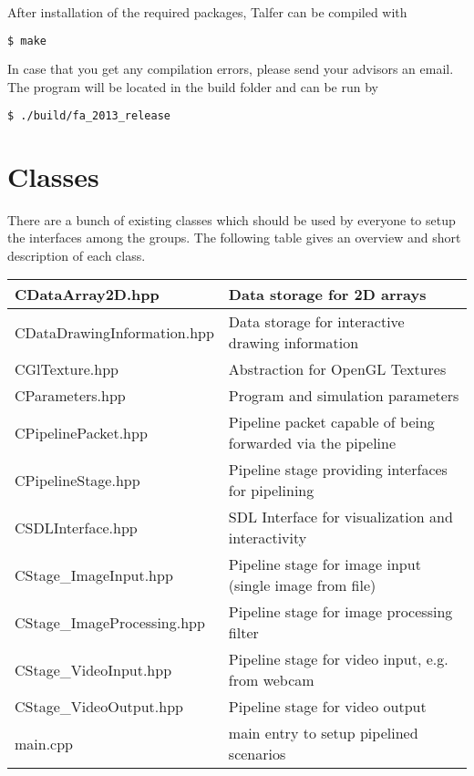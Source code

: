 \documentclass[11pt,a4paper]{article}
\begin{document}
After installation of the required packages, Talfer can be compiled with

\begin{lstlisting}[language=sh]
$ make
\end{lstlisting}

In case that you get any compilation errors, please send your advisors an
email. The program will be located in the build folder and can be run by

\begin{lstlisting}[language=sh]
$ ./build/fa_2013_release
\end{lstlisting}





\section{Classes}

There are a bunch of existing classes which should be used by everyone to setup
the interfaces among the groups.
The following table gives an overview and short description of each class.

\noindent
\begin{tabular}{|l|l|}
	\hline
	CDataArray2D.hpp				&
		Data storage for 2D arrays							\\
	\hline
	CDataDrawingInformation.hpp		&
		Data storage for interactive drawing information	\\
	\hline
	CGlTexture.hpp					&
		Abstraction for OpenGL Textures						\\
	\hline
	CParameters.hpp					&
		Program and simulation parameters					\\
	\hline
	CPipelinePacket.hpp				&
		Pipeline packet capable of being forwarded via the pipeline	\\
	\hline
	CPipelineStage.hpp				&
		Pipeline stage providing interfaces for pipelining	\\
	\hline
	CSDLInterface.hpp				&
		SDL Interface for visualization and interactivity	\\
	\hline
	CStage\_ImageInput.hpp			&
		Pipeline stage for image input (single image from file)	\\
	\hline
	CStage\_ImageProcessing.hpp		&
		Pipeline stage for image processing filter			\\
	\hline
	CStage\_VideoInput.hpp			&
		Pipeline stage for video input, e.g.\,from webcam	\\
	\hline
	CStage\_VideoOutput.hpp			&
		Pipeline stage for video output				\\			
	\hline
	main.cpp						&
		main entry to setup pipelined scenarios		\\
	\hline
\end{tabular}
\end{document}
